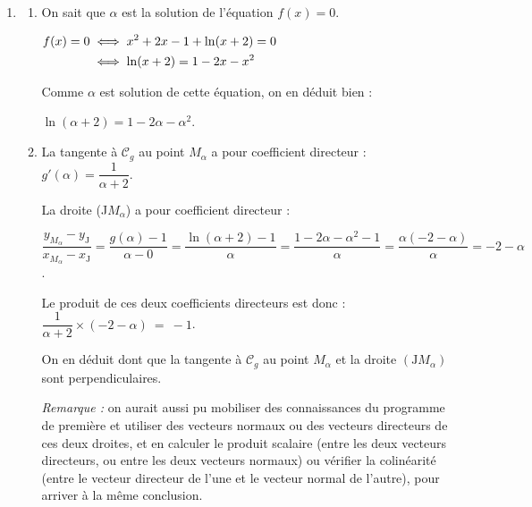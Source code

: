 \begin{enumerate}
\item \begin{enumerate}
	\item On sait que $\alpha$ est la solution de l'équation $f(x) = 0$.

	$\aligned f(x) = 0 &\iff x^2 + 2x - 1 + \ln(x+2) = 0\\
	&\iff \ln(x+2) = 1 - 2x -x^2 \endaligned$

	Comme $\alpha$ est solution de cette équation, on en déduit bien :

	$\ln (\alpha+2)=1-2 \alpha-\alpha^{2}$.

	\item La tangente à $\mathcal{C}_g$ au point $M_\alpha$ a pour coefficient directeur :\quad $g'(\alpha) = \dfrac{1}{\alpha + 2}$.

	La droite (J$M_\alpha$) a pour coefficient directeur :

	$\dfrac{y_{M_\alpha} - y_\mathrm{J}}{x_{M_\alpha} - x_\mathrm{J}} = \dfrac{g(\alpha) - 1}{\alpha - 0} = \dfrac{\ln(\alpha + 2)-1}{\alpha} = \dfrac{1 - 2\alpha - \alpha^2 - 1}{\alpha} = \dfrac{\alpha (-2 - \alpha)}{\alpha } = -2 - \alpha$.

	Le produit de ces deux coefficients directeurs est donc : \quad $\dfrac{1}{\alpha + 2}\times (-2-\alpha)~=~ -1$.

	On en déduit dont que la tangente à $\mathcal{C}_{g}$ au point $M_{\alpha}$ et la droite $\left(\mathrm{J}M_{\alpha}\right)$ sont perpendiculaires.

	\emph{Remarque :} on aurait aussi pu mobiliser des connaissances du programme de première et utiliser des vecteurs normaux ou des vecteurs directeurs de ces deux droites, et en calculer le produit scalaire (entre les deux vecteurs directeurs, ou entre les deux vecteurs normaux) ou vérifier la colinéarité (entre le vecteur directeur de l'une et le vecteur normal de l'autre), pour arriver à la même conclusion.
\end{enumerate}
\end{enumerate}


